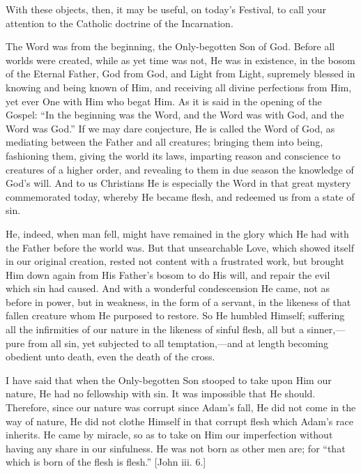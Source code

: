 With these objects, then, it may be useful, on today's Festival, to
call your attention to the Catholic doctrine of the Incarnation.

The Word was from the beginning, the Only-begotten Son of God.
Before all worlds were created, while as yet time was not, He was in
existence, in the bosom of the Eternal Father, God from God, and Light
from Light, supremely blessed in knowing and being known of Him, and
receiving all divine perfections from Him, yet ever One with Him who
begat Him. As it is said in the opening of the Gospel: ``In the
beginning was the Word, and the Word was with God, and the Word was
God.'' If we may dare conjecture, He is called the Word of God, as
mediating between the Father and all creatures; bringing them into
being, fashioning them, giving the world its laws, imparting reason
and conscience to creatures of a higher order, and revealing to them
in due season the knowledge of God's will. And to us Christians He is
especially the Word in that great mystery commemorated today, whereby
He became flesh, and redeemed us from a state of sin.

He, indeed, when man fell, might have remained in the glory which
He had with the Father before the world was. But that unsearchable
Love, which showed itself in our original creation, rested not content
with a frustrated work, but brought Him down again from His Father's
bosom to do His will, and repair the evil which sin had caused. And
with a wonderful condescension He came, not as before in power, but in
weakness, in the form of a servant, in the likeness of that fallen
creature whom He purposed to restore. So He humbled Himself; suffering
all the infirmities of our nature in the likeness of sinful flesh, all
but a sinner,—pure from all sin, yet subjected to all temptation,—and
at length becoming obedient unto death, even the death of the cross.

I have said that when the Only-begotten Son stooped to take upon
Him our nature, He had no fellowship with sin. It was impossible that
He should. Therefore, since our nature was corrupt since Adam's fall,
He did not come in the way of nature, He did not clothe Himself in
that corrupt flesh which Adam's race inherits. He came by miracle, so
as to take on Him our imperfection without having any share in our
sinfulness. He was not born as other men are; for ``that which is
born of the flesh is flesh.'' [John iii. 6.]

